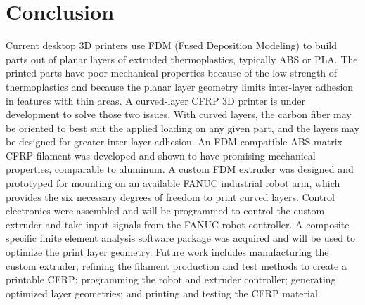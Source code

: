 \section{Conclusion}

Current desktop 3D printers use FDM (Fused Deposition Modeling) to build parts out of planar layers of extruded thermoplastics, typically ABS or PLA. The printed parts have poor mechanical properties because of the low strength of thermoplastics and because the planar layer geometry limits inter-layer adhesion in features with thin areas. A curved-layer CFRP 3D printer is under development to solve those two issues. With curved layers, the carbon fiber may be oriented to best suit the applied loading on any given part, and the layers may be designed for greater inter-layer adhesion. An FDM-compatible ABS-matrix CFRP filament was developed and shown to have promising mechanical properties, comparable to aluminum. A custom FDM extruder was designed and prototyped for mounting on an available FANUC industrial robot arm, which provides the six necessary degrees of freedom to print curved layers. Control electronics were assembled and will be programmed to control the custom extruder and take input signals from the FANUC robot controller. A composite-specific finite element analysis software package was acquired and will be used to optimize the print layer geometry. Future work includes manufacturing the custom extruder; refining the filament production and test methods to create a printable CFRP; programming the robot and extruder controller; generating optimized layer geometries; and printing and testing the CFRP material. 

